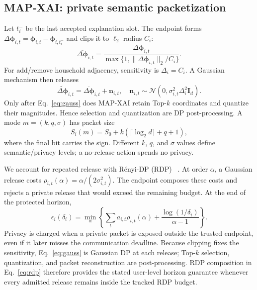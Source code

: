 \documentclass[conference]{IEEEtran}
\newcommand{\mapxai}{MAP-XAI}
\begin{document}
\subsection{MAP-XAI: private semantic packetization}

Let $t_i^-$ be the last accepted explanation slot. The endpoint forms
$\Delta\bm\phi_{i,t}=\bm\phi_{i,t}-\bm\phi_{i,t_i^-}$ and clips it to
$\ell_2$ radius $C_i$:
\begin{equation}
\overline{\Delta\bm\phi}_{i,t}=
\frac{\Delta\bm\phi_{i,t}}
{\max\{1,\|\Delta\bm\phi_{i,t}\|_2/C_i\}}.
\label{eq:clip}
\end{equation}
For add/remove household adjacency, sensitivity is $\Delta_i=C_i$. A
Gaussian mechanism then releases
\begin{equation}
\widetilde{\Delta\bm\phi}_{i,t}=
\overline{\Delta\bm\phi}_{i,t}+\bm n_{i,t},\quad
\bm n_{i,t}\sim\mathcal N(0,\sigma_{i,t}^2\Delta_i^2\bm I_d).
\label{eq:gauss}
\end{equation}
Only after Eq.~\eqref{eq:gauss} does \mapxai{} retain Top-$k$ coordinates
and quantize their magnitudes. Hence selection and quantization are DP
post-processing. A mode $m=(k,q,\sigma)$ has packet size
\begin{equation}
S_i(m)=S_0+k(\lceil\log_2 d\rceil+q+1),
\label{eq:size}
\end{equation}
where the final bit carries the sign. Different $k$, $q$, and $\sigma$
values define semantic/privacy levels; a no-release action spends no
privacy.

We account for repeated release with R\'enyi-DP (RDP)
~\cite{mironov2017rdp}. At order $\alpha$, a Gaussian release costs
$\rho_{i,t}(\alpha)=\alpha/(2\sigma_{i,t}^2)$. The endpoint composes
these costs and rejects a private release that would exceed the remaining
budget. At the end of the protected horizon,
\begin{equation}
\epsilon_i(\delta_i)=\min_{\alpha}
\left\{\sum_t a_{i,t}\rho_{i,t}(\alpha)+
\frac{\log(1/\delta_i)}{\alpha-1}\right\}.
\label{eq:rdp}
\end{equation}
Privacy is charged when a private packet is exposed outside the trusted
endpoint, even if it later misses the communication deadline. Because
clipping fixes the sensitivity, Eq.~\eqref{eq:gauss} is Gaussian DP at
each release; Top-$k$ selection, quantization, and packet reconstruction
are post-processing. RDP composition in Eq.~\eqref{eq:rdp} therefore
provides the stated user-level horizon guarantee whenever every admitted
release remains inside the tracked RDP budget.
\end{document}
